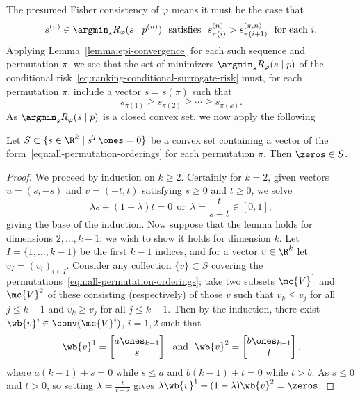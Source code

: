 \documentclass[11pt]{article}
\newcommand{\sloss}{\varphi}  %
\newcommand{\sups}[1]{^{({#1})}} %
\begin{document}
The presumed Fisher consistency of $\sloss$ means it must
be the case that
\begin{equation*}
  s\sups{n} \in \argmin_s R_\sloss(s \mid p\sups{n})
  ~~ \mbox{satisfies} ~~
  s\sups{n}_{\pi(i)} > s\sups{\pi,n}_{\pi(i+1)}
  ~~ \mbox{for~each}~i.
\end{equation*}
Applying Lemma~\ref{lemma:epi-convergence} for each such sequence
and permutation $\pi$, we see that
the set of minimizers $\argmin_s R_\sloss(s \mid p)$ of the
conditional risk~\eqref{eq:ranking-conditional-surrogate-risk}
must, for each permutation $\pi$, include a vector $s = s(\pi)$ such that
\begin{equation}
  \label{eqn:all-permutation-orderings}
  s_{\pi(1)} \ge s_{\pi(2)} \ge \cdots \ge s_{\pi(k)}.
\end{equation}
As $\argmin_s R_\sloss(s \mid p)$ is a closed convex set, we now apply
the following
\begin{lemma}
  Let $S \subset \{s \in \R^k \mid s^T\ones = 0\}$ be a convex set containing
  a vector of the form~\eqref{eqn:all-permutation-orderings} for each
  permutation $\pi$. Then $\zeros \in S$.
\end{lemma}
\begin{proof}
  We proceed by induction on $k \ge 2$.
  Certainly for $k = 2$, given
  vectors $u = (s, -s)$ and $v = (-t, t)$ satisfying
  $s \ge 0$ and $t \ge 0$, we solve
  \begin{equation*}
    \lambda s + (1 - \lambda) t = 0
    ~~ \mbox{or} ~~
    \lambda = \frac{t}{s + t} \in [0, 1],
  \end{equation*}
  giving the base of the induction.
  Now suppose that
  the lemma holds for dimensions $2, \ldots, k - 1$; we wish to show
  it holds for dimension $k$. Let $I = \{1, \ldots, k-1\}$ be the
  first $k-1$ indices, and for a vector $v \in \R^k$ let $v_I = (v_i)_{i \in I}$.
  Consider any collection $\{v\} \subset S$ covering the
  permutations~\eqref{eqn:all-permutation-orderings}; take two subsets
  $\mc{V}^1$ and $\mc{V}^2$ of these consisting (respectively) of those $v$
  such that $v_k \le v_j$ for all $j \le k-1$ and $v_k \ge v_j$ for all $j
  \le k-1$.
  Then by the induction, there exist $\wb{v}^i \in
  \conv(\mc{V}^i)$, $i = 1, 2$ such that
  \begin{equation*}
    \wb{v}^1 = \left[\begin{matrix} a \ones_{k-1} \\ s \end{matrix}
      \right] ~~ \mbox{and} ~~
    \wb{v}^2 = \left[\begin{matrix} b \ones_{k-1} \\ t \end{matrix}
      \right],
  \end{equation*}
  where $a(k - 1) + s = 0$ while $s \le a$ and $b(k - 1) + t = 0$
  while $t > b$.
  As $s \le 0$ and $t > 0$, so setting
  $\lambda = \frac{t}{t - s}$ gives
  $\lambda \wb{v}^1 + (1 - \lambda) \wb{v}^2 = \zeros$.
\end{proof}
\end{document}
